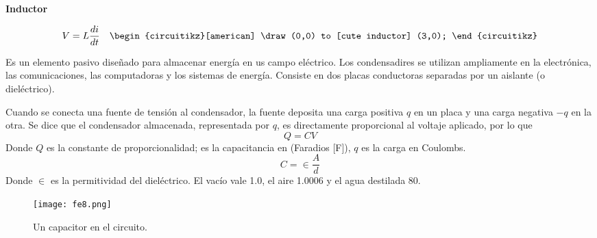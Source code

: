 \textbf{Inductor}
\begin{center}
	\begin{align}
		 & V=L\frac{di}{dt} & \begin{circuitikz}[american]
			                      \draw (0,0) to [cute inductor] (3,0);
		                      \end{circuitikz}
	\end{align}
\end{center}

\begin{definition}[Capacitor]
	Es un elemento pasivo diseñado para almacenar energía en us campo eléctrico. Los condensadires se utilizan ampliamente en la electrónica, las comunicaciones, las computadoras y los sistemas de energía.
	Consiste en dos placas conductoras separadas por un aislante (o dieléctrico).
\end{definition}

Cuando se conecta una fuente de tensión al condensador, la fuente deposita una carga positiva $q$ en un placa y una carga negativa $-q$ en la otra. Se dice que el condensador almacenada, representada por $q$, es directamente proporcional al voltaje aplicado, por lo que
\begin{equation}
	Q=CV
\end{equation}
Donde $Q$ es la constante de proporcionalidad; es la capacitancia en (Faradios [F]), $q$ es la carga en Coulombs.
\begin{equation}
	C=\in \frac{A}{d}
\end{equation}
Donde $\in$ es la permitividad del dieléctrico. El vacío vale 1.0, el aire 1.0006 y el agua destilada 80.

\begin{figure}[h!]
	\centerline{\texttt{[image: fe8.png]}}
	\caption{Un capacitor en el circuito.}
	\label{fe8}
\end{figure}

